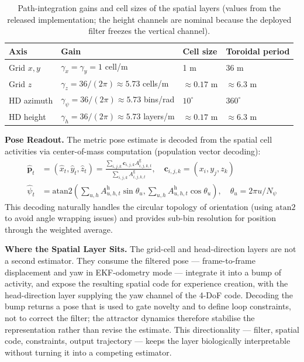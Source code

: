 \begin{table}[!htbp]
    \centering
    \caption{Path-integration gains and cell sizes of the spatial layers (values from the released implementation; the height channels are nominal because the deployed filter freezes the vertical channel).}
    \label{tab:gains}
    \footnotesize
    \begin{tabular}{@{}llll@{}}
        \toprule
        Axis & Gain & Cell size & Toroidal period \\
        \midrule
        Grid $x,y$ & $\gamma_x=\gamma_y=1$ cell/m & 1 m & 36 m \\
        Grid $z$ & $\gamma_z=36/(2\pi)\approx5.73$ cells/m & $\approx0.17$ m & $\approx6.3$ m \\
        HD azimuth & $\gamma_\psi=36/(2\pi)\approx5.73$ bins/rad & $10^{\circ}$ & $360^{\circ}$ \\
        HD height & $\gamma_h=36/(2\pi)\approx5.73$ layers/m & $\approx0.17$ m & $\approx6.3$ m \\
        \bottomrule
    \end{tabular}
\end{table}
\textbf{Pose Readout.} The metric pose estimate is decoded from the spatial cell activities via center-of-mass computation (population vector decoding):
\begin{align}
    \hat{\mathbf{p}}_t & = ({\hat x}_t, {\hat y}_t, {\hat z}_t) = \frac{\sum_{i,j,k} \mathbf{c}_{i,j,k} A^\mathrm{g}_{i,j,k,t}}{\sum_{i,j,k} A^\mathrm{g}_{i,j,k,t}}, \quad \mathbf{c}_{i,j,k} = (x_i, y_j, z_k) \\
    \hat{\psi}_t       & = \mathrm{\mathrm{atan2}}\left(\sum_{u,h} A^\mathrm{h}_{u,h,t} \sin\theta_u, \sum_{u,h} A^\mathrm{h}_{u,h,t} \cos\theta_u\right), \quad \theta_u = 2\pi u / N_\psi
\end{align}
This decoding naturally handles the circular topology of orientation (using $\mathrm{\mathrm{atan2}}$ to avoid angle wrapping issues) and provides sub-bin resolution for position through the weighted average.

\textbf{Where the Spatial Layer Sits.} The grid-cell and head-direction layers are not a second estimator. They consume the filtered pose --- frame-to-frame displacement and yaw in EKF-odometry mode --- integrate it into a bump of activity, and expose the resulting spatial code for experience creation, with the head-direction layer supplying the yaw channel of the 4-DoF code. Decoding the bump returns a pose that is used to gate novelty and to define loop constraints, not to correct the filter; the attractor dynamics therefore stabilise the representation rather than revise the estimate. This directionality --- filter, spatial code, constraints, output trajectory --- keeps the layer biologically interpretable without turning it into a competing estimator.

